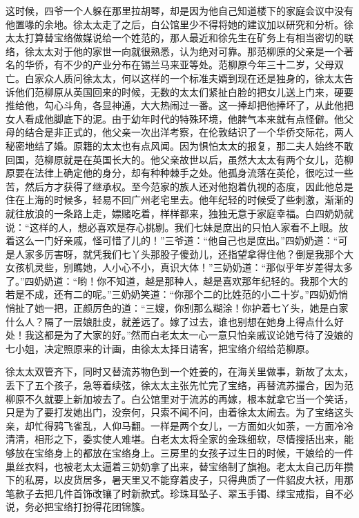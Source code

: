 \par 这时候，四爷一个人躲在那里拉胡琴，却是因为他自己知道楼下的家庭会议中没有他置喙的余地。徐太太走了之后，白公馆里少不得将她的建议加以研究和分析。徐太太打算替宝络做媒说给一个姓范的，那人最近和徐先生在矿务上有相当密切的联络，徐太太对于他的家世一向就很熟悉，认为绝对可靠。那范柳原的父亲是一个著名的华侨，有不少的产业分布在锡兰马来亚等处。范柳原今年三十二岁，父母双亡。白家众人质问徐太太，何以这样的一个标准夫婿到现在还是独身的，徐太太告诉他们范柳原从英国回来的时候，无数的太太们紧扯白脸的把女儿送上门来，硬要推给他，勾心斗角，各显神通，大大热闹过一番。这一捧却把他捧坏了，从此他把女人看成他脚底下的泥。由于幼年时代的特殊环境，他脾气本来就有点怪僻。他父母的结合是非正式的，他父亲一次出洋考察，在伦敦结识了一个华侨交际花，两人秘密地结了婚。原籍的太太也有点风闻。因为惧怕太太的报复，那二夫人始终不敢回国，范柳原就是在英国长大的。他父亲故世以后，虽然大太太有两个女儿，范柳原要在法律上确定他的身分，却有种种棘手之处。他孤身流落在英伦，很吃过一些苦，然后方才获得了继承权。至今范家的族人还对他抱着仇视的态度，因此他总是住在上海的时候多，轻易不回广州老宅里去。他年纪轻的时候受了些刺激，渐渐的就往放浪的一条路上走，嫖赌吃着，样样都来，独独无意于家庭幸福。白四奶奶就说：“这样的人，想必喜欢是存心挑剔。我们七妹是庶出的只怕人家看不上眼。放着这么一门好亲戚，怪可惜了儿的！”三爷道：“他自己也是庶出。”四奶奶道：“可是人家多厉害呀，就凭我们七丫头那股子傻劲儿，还指望拿得住他？倒是我那个大女孩机灵些，别瞧她，人小心不小，真识大体！”三奶奶道：“那似乎年岁差得太多了。”四奶奶道：“哟！你不知道，越是那种人，越是喜欢那年纪轻的。我那个大的若是不成，还有二的呢。”三奶奶笑道：“你那个二的比姓范的小二十岁。”四奶奶悄悄扯了她一把，正颜厉色的道：“三嫂，你别那么糊涂！你护着七丫头，她是白家什么人？隔了一层娘肚皮，就差远了。嫁了过去，谁也别想在她身上得点什么好处！我这都是为了大家的好。”然而白老太太一心一意只怕亲戚议论她亏待了没娘的七小姐，决定照原来的计画，由徐太太择日请客，把宝络介绍给范柳原。
\par 徐太太双管齐下，同时又替流苏物色到一个姓姜的，在海关里做事，新故了太太，丢下了五个孩子，急等着续弦，徐太太主张先忙完了宝络，再替流苏撮合，因为范柳原不久就要上新加坡去了。白公馆里对于流苏的再嫁，根本就拿它当一个笑话，只是为了要打发她出门，没奈何，只索不闻不问，由着徐太太闹去。为了宝络这头亲，却忙得鸦飞雀乱，人仰马翻。一样是两个女儿，一方面如火如荼，一方面冷冷清清，相形之下，委实使人难堪。白老太太将全家的金珠细软，尽情搜括出来，能够放在宝络身上的都放在宝络身上。三房里的女孩子过生日的时候，干娘给的一件巢丝衣料，也被老太太逼着三奶奶拿了出来，替宝络制了旗袍。老太太自己历年攒下的私房，以皮货居多，暑天里又不能穿着皮子，只得典质了一件貂皮大袄，用那笔款子去把几件首饰改镶了时新款式。珍珠耳坠子、翠玉手镯、绿宝戒指，自不必说，务必把宝络打扮得花团锦簇。
